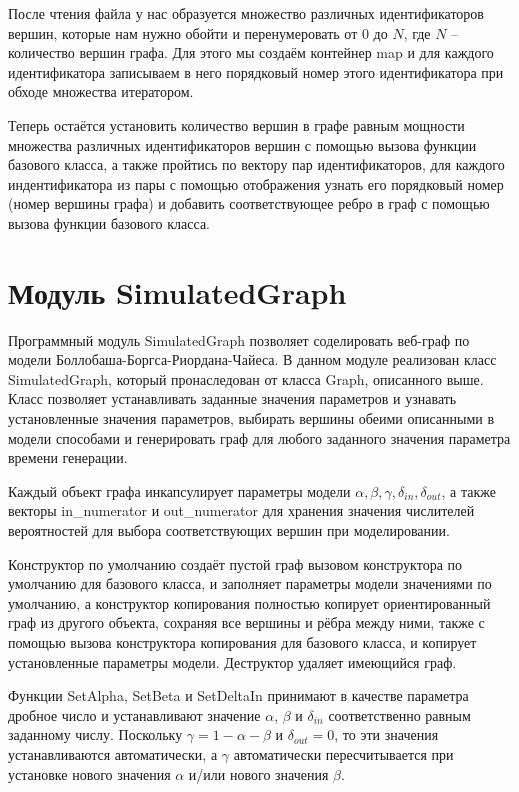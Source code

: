 \documentclass[14pt]{extreport}
\begin{document}
После чтения файла у нас образуется множество различных идентификаторов вершин, которые нам нужно обойти и перенумеровать от $0$ до $N$, где $N$ -- количество вершин графа. Для этого мы создаём контейнер map и для каждого идентификатора записываем в него порядковый номер этого идентификатора при обходе множества итератором.

Теперь остаётся установить количество вершин в графе равным мощности множества различных идентификаторов вершин с помощью вызова функции базового класса, а также пройтись по вектору пар идентификаторов, для каждого индентификатора из пары с помощью отображения узнать его порядковый номер (номер вершины графа) и добавить соответствующее ребро в граф с помощью вызова функции базового класса.

\section{Модуль SimulatedGraph}

Программный модуль SimulatedGraph позволяет соделировать веб-граф по модели Боллобаша-Боргса-Риордана-Чайеса. В данном модуле реализован класс SimulatedGraph, который пронаследован от класса Graph, описанного выше. Класс позволяет устанавливать заданные значения параметров и узнавать установленные значения параметров, выбирать вершины обеими описанными в модели способами и генерировать граф для любого заданного значения параметра времени генерации.

Каждый объект графа инкапсулирует параметры модели $\alpha, \beta, \gamma, \delta_{in}, \delta_{out}$, а также векторы in\_numerator и out\_numerator для хранения значения числителей вероятностей для выбора соответствующих вершин при моделировании.

Конструктор по умолчанию создаёт пустой граф вызовом конструктора по умолчанию для базового класса, и заполняет параметры модели значениями по умолчанию, а конструктор копирования полностью копирует ориентированный граф из другого объекта, сохраняя все вершины и рёбра между ними, также с помощью вызова конструктора копирования для базового класса, и копирует установленные параметры модели. Деструктор удаляет имеющийся граф.

Функции SetAlpha, SetBeta и SetDeltaIn принимают в качестве параметра дробное число и устанавливают значение $\alpha$, $\beta$ и $\delta_{in}$ соответственно равным заданному числу. Поскольку $\gamma = 1 - \alpha - \beta$ и $\delta_{out} = 0$, то эти значения устанавливаются автоматически, а $\gamma$ автоматически пересчитывается при установке нового значения $\alpha$ и/или нового значения $\beta$.
\end{document}
